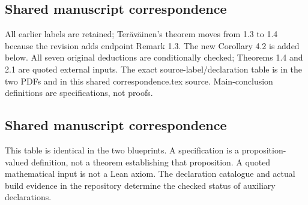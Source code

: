 \ifdefined\WebVersion
\subsection*{Shared manuscript correspondence}
All earlier labels are retained; Ter\"av\"ainen's theorem moves from 1.3 to 1.4 because the revision adds endpoint Remark 1.3. The new Corollary 4.2 is added below. All seven original deductions are conditionally checked; Theorems 1.4 and 2.1 are quoted external inputs. The exact source-label/declaration table is in the two PDFs and in this shared correspondence.tex source. Main-conclusion definitions are specifications, not proofs.
\else
\subsection*{Shared manuscript correspondence}
This table is identical in the two blueprints. A specification is a proposition-valued definition, not a theorem establishing that proposition. A quoted mathematical input is not a Lean axiom. The declaration catalogue and actual build evidence in the repository determine the checked status of auxiliary declarations.
\small

